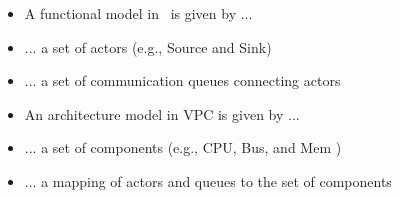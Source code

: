 \begin{frame}[t]

\begin{figure}
\centering
\resizebox{0.7\columnwidth}{!}{}
\end{figure}

\begin{itemize}
\item A functional model in \SysteMoC\ is given by ...
\item ... a set of actors (e.g., Source and Sink)
\item ... a set of communication queues connecting actors 
\end{itemize}
\end{frame}



\begin{frame}[t]

\begin{figure}
\centering
\resizebox{0.7\columnwidth}{!}{}
\end{figure}

\begin{itemize}
\item An architecture model in VPC is given by ...
\item ... a set of components (e.g., CPU, Bus, and Mem )
\item ... a mapping of actors and queues to the set of components
\end{itemize}
\end{frame}









